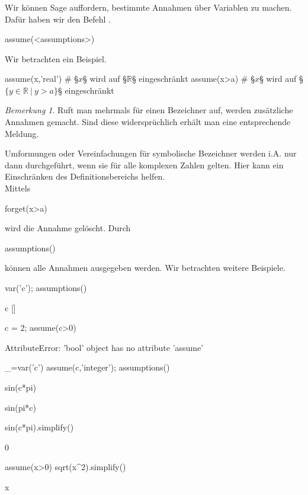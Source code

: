 \documentclass[fontsize=12pt,paper=a4,twoside,bibtotoc,idxtotoc,
liststotoc,pagesize,BCOR1.2cm,DIV15,chapterprefix,pagesize=pdftex]{scrbook}
\theoremstyle{plain}
\theoremstyle{definition}
\theoremstyle{remark}
\newtheorem{bem}[equation]{Bemerkung}
\begin{document}
\subsubsection{}
Wir können Sage auffordern, bestimmte Annahmen über Variablen zu machen. Dafür haben wir den Befehl .
\begin{sagein}
assume(<assumptions>)
\end{sagein}
Wir betrachten ein Beispiel.
\begin{sagein}
assume(x,'real') # §$x$§ wird auf §$\mathbb{R}$§ eingeschränkt
assume(x>a) # §$x$§ wird auf  §$\{y \in \mathbb{R}\ |\ y>a\}$§ eingeschränkt
\end{sagein}
\begin{bem}
Ruft man  mehrmals für einen Bezeichner auf, werden zusätzliche Annahmen gemacht. Sind diese
widersprüchlich erhält man eine entsprechende Meldung.
\end{bem}
Umformungen oder Vereinfachungen für symbolische Bezeichner
werden i.A. nur dann durchgeführt,
wenn sie für alle komplexen Zahlen gelten. Hier kann ein Einschränken
des Definitionsbereichs helfen.\\
 Mittels 
\begin{sagein}
forget(x>a)
\end{sagein}
wird die Annahme  gelöscht.
 Durch 
\begin{sagein}
assumptions() 
\end{sagein}
können alle Annahmen ausgegeben werden.
Wir betrachten weitere Beispiele.
\begin{sagein}
var('c'); assumptions()
\end{sagein}
\begin{sage}
c
[]
\end{sage}

\begin{sagein}
c = 2; assume(c>0)
\end{sagein}
\begin{sage}
 AttributeError: 'bool' object has no attribute 'assume'
\end{sage}
\begin{sagein}
_=var('c')
assume(c,'integer'); assumptions()
\end{sagein}
\begin{sage}
[c is integer]
\end{sage}
\begin{sagein}
sin(c*pi)
\end{sagein}
\begin{sage}
sin(pi*c)
\end{sage}
\begin{sagein}
sin(c*pi).simplify()
\end{sagein}
\begin{sage}
   0
\end{sage}
\begin{sagein}
assume(x>0)
sqrt(x^2).simplify()
\end{sagein}
\begin{sage}
  x
\end{sage}
\end{document}

